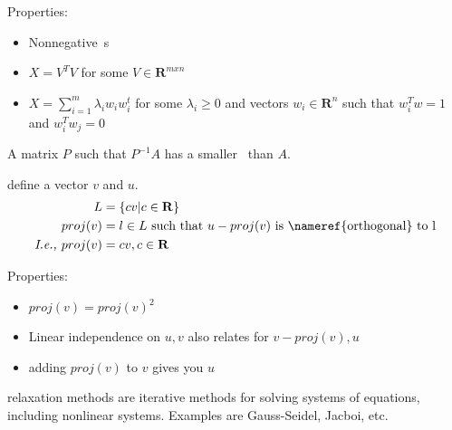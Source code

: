 \begin{definition}
    Properties:
    \begin{itemize}
        \item Nonnegative~s
        \item $X = V^{T}V$ for some $V \in \mathbf{R}^{mxn}$
        \item $X = \sum\limits_{i=1}^{m}\lambda_{i}w_{i}w^{t}_{i}$ 
            for some $\lambda_{i} \geq 0$ and vectors $w_{i} \in \mathbf{R}^{n}$
            such that $w^{T}_{i}w = 1$ and $w^{T}_{i}w_{j} = 0$

    \end{itemize}
\end{definition}

\begin{definition}[Preconditoner]
    A matrix $P$ such that $P^{-1}A$ has a smaller~
    than $A$.

\end{definition}

\begin{definition}[Projection]
    define a vector $v$ and $u$.
    \begin{align*}
        L &= \left\{cv | c \in \mathbf{R} \right\}  \\
        proj(v) &= l \in L \text{\ such that\ } u - proj(v) 
        \text{\ is~\nameref{orthogonal} to l}  \\
        \textit{I.e., } proj(v) &= cv, c \in \mathbf{R}
    \end{align*}

    Properties:
    \begin{itemize}
        \item $proj(v) = proj(v)^{2}$
        \item Linear independence on $u, v$ also relates for $v - proj(v), u$
        \item adding $proj(v)$ to $v$ gives you $u$
    \end{itemize}

\end{definition}

\begin{definition}
     relaxation methods are iterative methods for solving systems of equations,
     including nonlinear systems. Examples are Gauss-Seidel, Jacboi, etc.

\end{definition}

